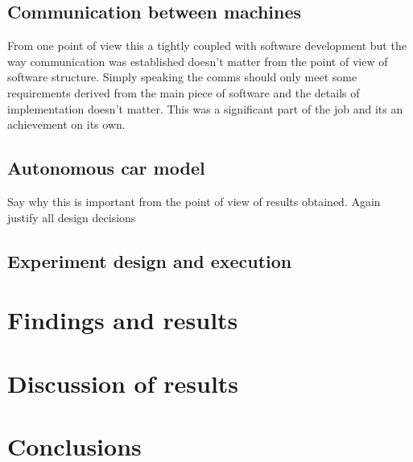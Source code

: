 \documentclass[11pt]{article}
\begin{document}
\subsection{Communication between machines}

From one point of view this a tightly coupled with software development but the way
communication was established doesn’t matter from the point of view of software structure.
Simply speaking the comms should only meet some requirements derived from
the main piece of software and the details of implementation doesn’t matter. This was
a significant part of the job and its an achievement on its own.

\subsection{Autonomous car model}

Say why this is important from the point of view of results obtained. Again justify all
design decisions

\subsection{Experiment design and execution}



\section{Findings and results}

\section{Discussion of results}


\section{Conclusions}












\end{document}
